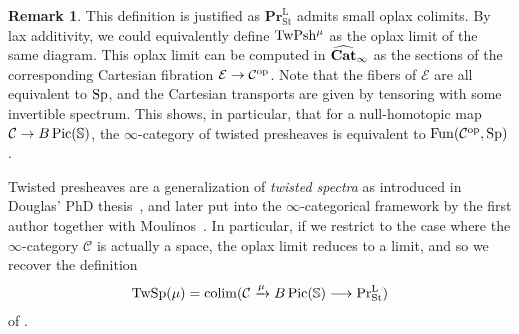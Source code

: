 \documentclass[10pt]{amsart}
\numberwithin{equation}{section}
\theoremstyle{definition}
\newtheorem{rem}[prop]{Remark}
\DeclareMathOperator{\Fun}{Fun}
\DeclareMathOperator{\Pic}{Pic}
\DeclareMathOperator{\op}{op}
\DeclareMathOperator{\St}{St}
\DeclareMathOperator*{\colim}{colim}
\renewcommand{\Pr}{\mathrm{Pr}}
\newcommand{\bfPr}{\mathbf{Pr}}
\newcommand{\rL}{\mathrm{L}}
\newcommand{\PrLSt}{\Pr^{\rL}_{\St}}
\newcommand{\TwShv}{\mathrm{TwPsh}\vphantom{h}}
\newcommand{\TwSp}{\mathrm{TwSp}\vphantom{h}}
\newcommand{\bfCat}{\mathbf{Cat}\vphantom{t}}
\newcommand{\bS}{\mathbb{S}}
\newcommand{\cC}{\mathcal{C}}
\newcommand{\cE}{\mathcal{E}}
\newcommand{\Sp}{\mathrm{Sp}\vphantom{p}}
\renewcommand{\to}{\mathchoice{\longrightarrow}{\rightarrow}{}{}}
\begin{document}
\begin{rem}\label{rem:lax_additivity}
	This definition is justified as $\bfPr^{\rL}_{\St}$ admits small oplax colimits.
  By lax additivity, we could equivalently define $\TwShv^{\mu}$ as the oplax limit of the same diagram.
  This oplax limit can be computed in $\widehat{\bfCat}_{\infty}$ as the sections of the corresponding Cartesian fibration $\cE \to \cC^{\op}$.
  Note that the fibers of $\cE$ are all equivalent to $\Sp$, and the Cartesian transports are given by tensoring with some invertible spectrum.
  This shows, in particular, that for a null-homotopic map $\cC \to B\Pic(\bS)$, the $\infty$-category of twisted presheaves is equivalent to $\Fun(\cC^{\op},\Sp)$.
\end{rem}

Twisted presheaves are a generalization of \emph{twisted spectra} as introduced in Douglas' PhD thesis~\cite{Dou}, and later put into the $\infty$-categorical framework by the first author together with Moulinos~\cite{HM}.
In particular, if we restrict to the case where the $\infty$-category $\cC$ is actually a space, the oplax limit reduces to a limit, and so we recover the definition
\begin{align*}
	\TwSp(\mu) = \colim(\cC\xrightarrow{\mu} B\Pic(\bS) \to \PrLSt)
\end{align*}
of \cite{HM}.
\end{document}
